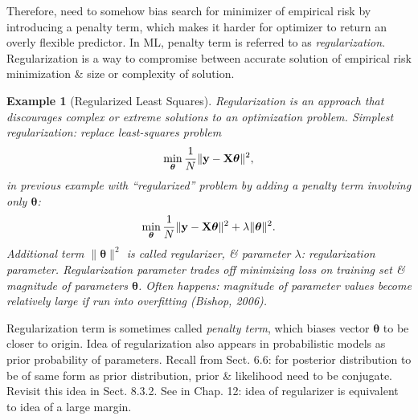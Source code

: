 \documentclass{article}
\newtheorem{example}{Example}
\begin{document}
\begin{itemize}
\begin{itemize}
\begin{itemize}
			Therefore, need to somehow bias search for minimizer of empirical risk by introducing a penalty term, which makes it harder for optimizer to return an overly flexible predictor. In ML, penalty term is referred to as {\it regularization}. Regularization is a way to compromise between accurate solution of empirical risk minimization \& size or complexity of solution.
			\begin{example}[Regularized Least Squares]
				Regularization is an approach that discourages complex or extreme solutions to an optimization problem. Simplest regularization: replace least-squares problem
				\begin{equation}
					\min_{\boldsymbol{\theta}} \frac{1}{N}\|{\bf y} - {\bf X}\boldsymbol{\theta}\|^2,
				\end{equation}
				in previous example with ``regularized'' problem by adding a penalty term involving only $\boldsymbol{\theta}$:
				\begin{equation}
					\min_{\boldsymbol{\theta}} \frac{1}{N}\|{\bf y} - {\bf X}\boldsymbol{\theta}\|^2 + \lambda\|\boldsymbol{\theta}\|^2.
				\end{equation}
				Additional term $\|\boldsymbol{\theta}\|^2$ is called {\it regularizer}, \& parameter $\lambda$: {\it regularization parameter}. Regularization parameter trades off minimizing loss on training set \& magnitude of parameters $\boldsymbol{\theta}$. Often happens: magnitude of parameter values become relatively large if run into overfitting (Bishop, 2006).
			\end{example}
			Regularization term is sometimes called {\it penalty term}, which biases vector $\boldsymbol{\theta}$ to be closer to origin. Idea of regularization also appears in probabilistic models as prior probability of parameters. Recall from Sect. 6.6: for posterior distribution to be of same form as prior distribution, prior \& likelihood need to be conjugate. Revisit this idea in Sect. 8.3.2. See in Chap. 12: idea of regularizer is equivalent to idea of a large margin.

\end{itemize}
\end{itemize}
\end{itemize}
\end{document}
